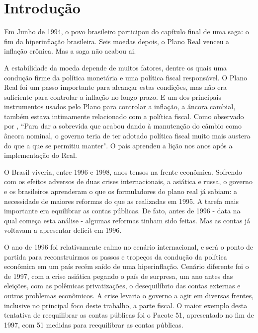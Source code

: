 \documentclass{article}
\begin{document}
\newpage

\setcounter{page}{1}
\tableofcontents

\newpage

\section{Introdução}

Em Junho de 1994, o povo brasileiro participou do capítulo final de uma saga: o fim da hiperinflação brasileira. Seis moedas depois, o Plano Real venceu a inflação crônica. Mas a saga não acabou ai.

A estabilidade da moeda depende de muitos fatores, dentre os quais uma condução firme da política monetária e uma política fiscal responsável. O Plano Real foi um passo importante para alcançar estas condições, mas não era suficiente para controlar a inflação no longo prazo. E um dos principais instrumentos usados pelo Plano para controlar a inflação, a âncora cambial, também estava intimamente relacionado com a política fiscal. Como observado por \citet[p. 332]{Werneck2014}, ``Para dar a sobrevida que acabou dando à manutenção do câmbio como âncora nominal, o governo teria de ter adotado política fiscal muito mais austera do que a que se permitiu manter". O país aprendeu a lição nos anos após a implementação do Real. %

O Brasil viveria, entre 1996 e 1998, anos tensos na frente econômica. Sofrendo com os efeitos adversos de duas crises internacionais, a asiática e russa, o governo e os brasileiros aprenderam o que os formuladores do plano real já sabiam: a necessidade de maiores reformas do que as realizadas em 1995. A tarefa mais importante era equilibrar as contas públicas. De fato, antes de 1996 - data na qual começa esta análise - algumas reformas tinham sido feitas. Mas as contas já voltavam a apresentar deficit em 1996.

O ano de 1996 foi relativamente calmo no cenário internacional, e será o ponto de partida para reconstruirmos os passos e tropeços da condução da política econômica em um país recém saído de uma hiperinflação. Cenário diferente foi o de 1997, com a crise asiática pegando o país de surpresa, um ano antes das eleições, com as polêmicas privatizações, o desequilíbrio das contas externas e outros problemas econômicos. A crise levaria o governo a agir em diversas frentes, inclusive no principal foco deste trabalho, a parte fiscal. O maior exemplo desta tentativa de reequilibrar as contas públicas foi o Pacote 51, apresentado no fim de 1997, com 51 medidas para reequilibrar as contas públicas.
\end{document}
